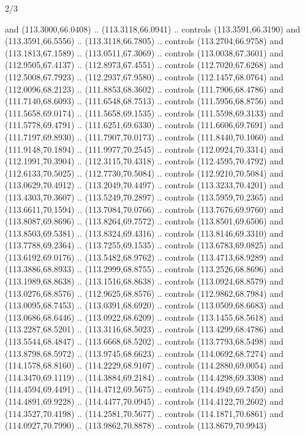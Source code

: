 \begin{flagdescription}{2/3}
\begin{scope}[shift={(0.5\flaglength,0.5)},scale=\flagwidth/320]
\begin{scope}[y=0.8pt, x=0.8pt, yscale=-1,shift={(-118.3,-146)}]
  and (113.3000,66.0408) .. (113.3118,66.0941) .. controls (113.3591,66.3190)
  and (113.3591,66.5556) .. (113.3118,66.7805) .. controls (113.2704,66.9758)
  and (113.1813,67.1589) .. (113.0511,67.3069) .. controls (113.0038,67.3601)
  and (112.9505,67.4137) .. (112.8973,67.4551) .. controls (112.7020,67.6268)
  and (112.5008,67.7923) .. (112.2937,67.9580) .. controls (112.1457,68.0764)
  and (112.0096,68.2123) .. (111.8853,68.3602) .. controls (111.7906,68.4786)
  and (111.7140,68.6093) .. (111.6548,68.7513) .. controls (111.5956,68.8756)
  and (111.5658,69.0174) .. (111.5658,69.1535) .. controls (111.5598,69.3133)
  and (111.5778,69.4791) .. (111.6251,69.6330) .. controls (111.6606,69.7691)
  and (111.7197,69.8930) .. (111.7907,70.0173) .. controls (111.8440,70.1060)
  and (111.9148,70.1894) .. (111.9977,70.2545) .. controls (112.0924,70.3314)
  and (112.1991,70.3904) .. (112.3115,70.4318) .. controls (112.4595,70.4792)
  and (112.6133,70.5025) .. (112.7730,70.5084) .. controls (112.9210,70.5084)
  and (113.0629,70.4912) .. (113.2049,70.4497) .. controls (113.3233,70.4201)
  and (113.4303,70.3607) .. (113.5249,70.2897) .. controls (113.5959,70.2365)
  and (113.6611,70.1594) .. (113.7084,70.0766) .. controls (113.7676,69.9760)
  and (113.8087,69.8696) .. (113.8264,69.7572) .. controls (113.8501,69.6506)
  and (113.8503,69.5381) .. (113.8324,69.4316) .. controls (113.8146,69.3310)
  and (113.7788,69.2364) .. (113.7255,69.1535) .. controls (113.6783,69.0825)
  and (113.6192,69.0176) .. (113.5482,68.9762) .. controls (113.4713,68.9289)
  and (113.3886,68.8933) .. (113.2999,68.8755) .. controls (113.2526,68.8696)
  and (113.1989,68.8638) .. (113.1516,68.8638) .. controls (113.0924,68.8579)
  and (113.0276,68.8576) .. (112.9625,68.8576) .. controls (112.9862,68.7984)
  and (113.0095,68.7453) .. (113.0391,68.6920) .. controls (113.0509,68.6683)
  and (113.0686,68.6446) .. (113.0922,68.6209) .. controls (113.1455,68.5618)
  and (113.2287,68.5201) .. (113.3116,68.5023) .. controls (113.4299,68.4786)
  and (113.5544,68.4847) .. (113.6668,68.5202) .. controls (113.7793,68.5498)
  and (113.8798,68.5972) .. (113.9745,68.6623) .. controls (114.0692,68.7274)
  and (114.1578,68.8160) .. (114.2229,68.9107) .. controls (114.2880,69.0054)
  and (114.3470,69.1119) .. (114.3884,69.2184) .. controls (114.4298,69.3308)
  and (114.4594,69.4491) .. (114.4712,69.5675) .. controls (114.4949,69.7450)
  and (114.4891,69.9228) .. (114.4477,70.0945) .. controls (114.4122,70.2602)
  and (114.3527,70.4198) .. (114.2581,70.5677) .. controls (114.1871,70.6861)
  and (114.0927,70.7990) .. (113.9862,70.8878) .. controls (113.8679,70.9943)

\end{scope}
\end{scope}
\end{flagdescription}
